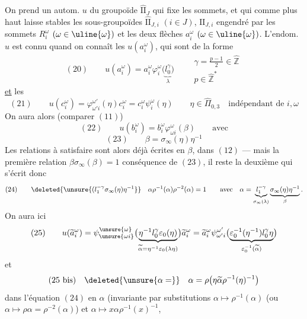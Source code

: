 On prend un autom. $u$ du groupoïde $\widehat{\mathrm{II}}_J$ qui  fixe les sommets, et qui comme plus haut laisse stables les sous-groupoïdes $\widehat{\mathrm{II}}_{J,i}$ $(i\in J)$,  $\mathrm{II}_{J,i}$ engendré par les  sommets $R_i^\omega$ $(\omega\in\uline{\omega})$ et les deux flèches $a_i^\omega$ $(\omega\in\uline{\omega})$.
 L'endom. $u$ est connu quand on connaît les $u(a_i^\omega)$, qui sont de la forme
\[
(20)\qquad u(a_i^\omega)=a_i^\omega\varphi_i^\omega\bigl(\underbrace{l_0^\gamma}_{\lambda}\bigr)
\qquad\begin{array}{l}\gamma=\frac{p-1}{2}\in\widehat{\mathbb Z}\\p\in\widehat{\mathbb Z}^{*}\end{array}
\]
\uline{et} les
\[
(21)\qquad u(c_i^\omega)=\varphi_{\omega'i}^{\omega'}(\eta)c_i^\omega=c_i^\omega\psi_i^\omega(\eta)
\qquad\eta\in\widehat\Pi_{0,3}\quad\text{indépendant de }i,\omega
\]
On aura alors (comparer $(11)$)
\[
(22)\qquad u(b_i^\omega)=b_i^\omega\varphi_{\omega i}^\omega(\beta)\qquad\text{avec}
\]
\[
(23)\qquad\beta=\sigma_\infty(\eta)\eta^{-1}
\]
Les relations à satisfaire sont alors déjà écrites en  $\beta$,  dans $(12)$ --- mais la première relation $\beta\sigma_\infty(\beta)=1$ conséquence de $(23)$, il reste la deuxième qui s'écrit donc
\[
(24)\qquad\deleted{\unsure{(l_1^{-\gamma}\sigma_\infty(\eta)\eta^{-1}}}
\quad\alpha\rho^{-1}(\alpha)\rho^{-2}(\alpha)=1
\qquad\text{avec}\quad\alpha=\underbrace{l_1^{-\gamma}}_{\sigma_\infty(\lambda)}\underbrace{\sigma_\infty(\eta)\eta^{-1}}_\beta.
\]
On aura ici
\[
(25)\qquad
u(\widetilde a_i^\omega)=\psi_{\unsure{\omega i}}^{\unsure{\omega}}\bigl(\underbrace{\eta^{-1}l_0^\gamma\varepsilon_0(\eta)}_{\widetilde\alpha=\eta^{-1}\varepsilon_0(\lambda\eta)}\bigr)\widetilde a_i^\omega
=\widetilde a_i^\omega\psi_{\omega'i}^{\omega'}\bigl(\underbrace{\varepsilon_0^{-1}(\eta^{-1})l_0^\gamma\eta}_{\varepsilon_0^{-1}(\widetilde\alpha)}\bigr)
\]
et
\[
(25\text{ bis})\quad\deleted{\unsure{\alpha=}}\quad\alpha=\rho\bigl(\eta\widetilde\alpha\rho^{-1}(\eta)^{-1}\bigr)
\]
 dans l'équation $(24)$ en $\alpha$ (invariante par substitutions $\alpha\mapsto\rho^{-1}(\alpha)$ (ou $\alpha\mapsto\rho\alpha=\rho^{-2}(\alpha)$) et $\alpha\mapsto x\alpha\rho^{-1}(x)^{-1}$,

